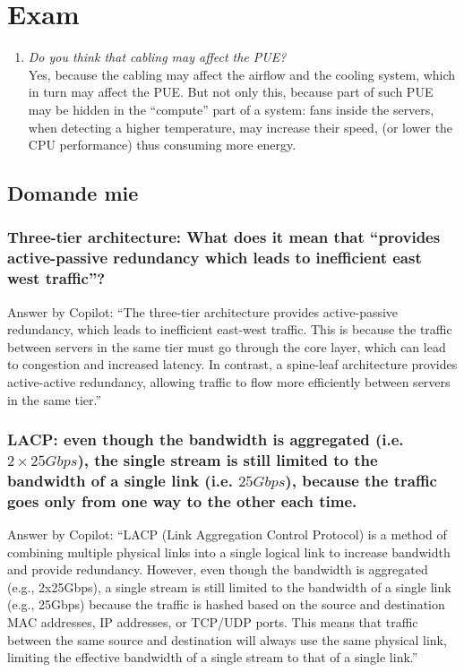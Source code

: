 \chapter{Exam}

\begin{enumerate}
   \item 
   \textit{Do you think that cabling may affect the PUE?}\\
   Yes, because the cabling may affect the airflow and the cooling system, which in turn may affect the PUE.
   But not only this, because part of such PUE may be hidden in the ``compute'' part of a system:
   fans inside the servers, when detecting a higher temperature, may increase their speed, (or lower the CPU performance) thus consuming more energy.
\end{enumerate}


\section{Domande mie}

\subsection{Three-tier architecture: What does it mean that ``provides active-passive redundancy which leads to inefficient east west traffic''?}

Answer by Copilot: 
``The three-tier architecture provides active-passive redundancy, which leads to inefficient east-west traffic. This is because the traffic between servers in the same tier must go through the core layer, which can lead to congestion and increased latency. In contrast, a spine-leaf architecture provides active-active redundancy, allowing traffic to flow more efficiently between servers in the same tier.'' 
   

\subsection{LACP: even though the bandwidth is aggregated (i.e. $2\times 25Gbps$), the single stream is still limited to the bandwidth of a single link (i.e. $25Gbps$), because the traffic goes only from one way to the other each time.}

Answer by Copilot: 
``LACP (Link Aggregation Control Protocol) is a method of combining multiple physical links into a single logical link to increase bandwidth and provide redundancy. However, even though the bandwidth is aggregated (e.g., 2x25Gbps), a single stream is still limited to the bandwidth of a single link (e.g., 25Gbps) because the traffic is hashed based on the source and destination MAC addresses, IP addresses, or TCP/UDP ports. This means that traffic between the same source and destination will always use the same physical link, limiting the effective bandwidth of a single stream to that of a single link.''